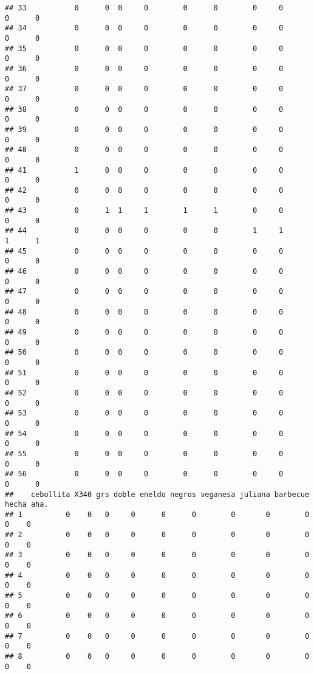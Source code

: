 \documentclass[
]{article}
\begin{document}
\begin{verbatim}
## 33           0      0  0     0        0      0        0     0       0      0
## 34           0      0  0     0        0      0        0     0       0      0
## 35           0      0  0     0        0      0        0     0       0      0
## 36           0      0  0     0        0      0        0     0       0      0
## 37           0      0  0     0        0      0        0     0       0      0
## 38           0      0  0     0        0      0        0     0       0      0
## 39           0      0  0     0        0      0        0     0       0      0
## 40           0      0  0     0        0      0        0     0       0      0
## 41           1      0  0     0        0      0        0     0       0      0
## 42           0      0  0     0        0      0        0     0       0      0
## 43           0      1  1     1        1      1        0     0       0      0
## 44           0      0  0     0        0      0        1     1       1      1
## 45           0      0  0     0        0      0        0     0       0      0
## 46           0      0  0     0        0      0        0     0       0      0
## 47           0      0  0     0        0      0        0     0       0      0
## 48           0      0  0     0        0      0        0     0       0      0
## 49           0      0  0     0        0      0        0     0       0      0
## 50           0      0  0     0        0      0        0     0       0      0
## 51           0      0  0     0        0      0        0     0       0      0
## 52           0      0  0     0        0      0        0     0       0      0
## 53           0      0  0     0        0      0        0     0       0      0
## 54           0      0  0     0        0      0        0     0       0      0
## 55           0      0  0     0        0      0        0     0       0      0
## 56           0      0  0     0        0      0        0     0       0      0
##    cebollita X340 grs doble eneldo negros veganesa juliana barbecue hecha aha.
## 1          0    0   0     0      0      0        0       0        0     0    0
## 2          0    0   0     0      0      0        0       0        0     0    0
## 3          0    0   0     0      0      0        0       0        0     0    0
## 4          0    0   0     0      0      0        0       0        0     0    0
## 5          0    0   0     0      0      0        0       0        0     0    0
## 6          0    0   0     0      0      0        0       0        0     0    0
## 7          0    0   0     0      0      0        0       0        0     0    0
## 8          0    0   0     0      0      0        0       0        0     0    0

\end{verbatim}
\end{document}

